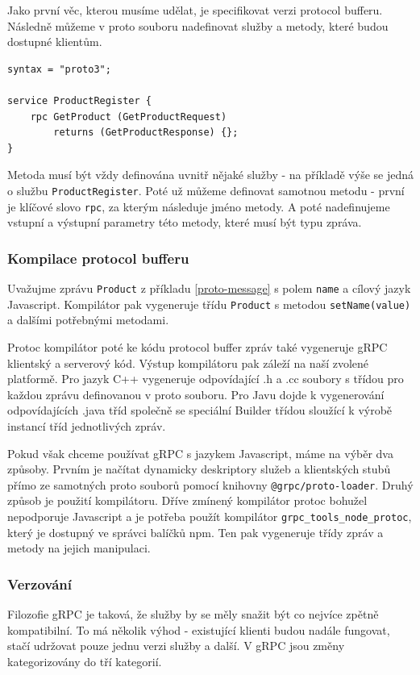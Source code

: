 \documentclass[thesis=M,czech]{FITthesis}[2019/12/23]
\begin{document}
Jako první věc, kterou musíme udělat, je specifikovat verzi protocol bufferu. Následně můžeme v proto souboru nadefinovat služby a metody, které budou dostupné klientům.

\begin{verbatim}
syntax = "proto3";

service ProductRegister {
    rpc GetProduct (GetProductRequest)
        returns (GetProductResponse) {};
}
\end{verbatim}
Metoda musí být vždy definována uvnitř nějaké služby - na příkladě  výše se jedná o službu \texttt{ProductRegister}. Poté už můžeme definovat samotnou metodu - první je klíčové slovo \texttt{rpc}, za kterým následuje jméno metody. A poté nadefinujeme vstupní a výstupní parametry této metody, které musí být typu zpráva.

\subsubsection*{Kompilace protocol bufferu}
Uvažujme zprávu \texttt{Product} z příkladu \ref{proto-message} s polem  \texttt{name} a cílový jazyk Javascript. Kompilátor pak vygeneruje třídu \texttt{Product} s metodou \texttt{setName(value)} a dalšími potřebnými metodami.

Protoc kompilátor poté ke kódu protocol buffer zpráv také vygeneruje gRPC klientský a serverový kód. Výstup kompilátoru pak záleží na naší zvolené platformě. Pro jazyk C++ vygeneruje odpovídající .h a .cc soubory s třídou pro každou zprávu definovanou v proto souboru. Pro Javu dojde k vygenerování odpovídajících .java tříd společně se speciální Builder třídou sloužící k výrobě instancí tříd jednotlivých zpráv.

Pokud však chceme používat gRPC s jazykem Javascript, máme na výběr dva způsoby. Prvním je načítat dynamicky deskriptory služeb a klientských stubů přímo ze samotných proto souborů pomocí knihovny \texttt{@grpc/proto-loader}.
Druhý způsob je použití kompilátoru. Dříve zmínený kompilátor protoc bohužel nepodporuje Javascript a je potřeba použít kompilátor \texttt{grpc_tools_node_protoc}, který je dostupný ve správci balíčků npm. Ten pak vygeneruje třídy zpráv a metody na jejich manipulaci.

\subsubsection*{Verzování}
Filozofie gRPC je taková, že služby by se měly snažit být co nejvíce zpětně kompatibilní. To má několik výhod - existující klienti budou nadále fungovat, stačí udržovat pouze jednu verzi služby a další. V gRPC jsou změny kategorizovány do tří kategorií.
\end{document}
